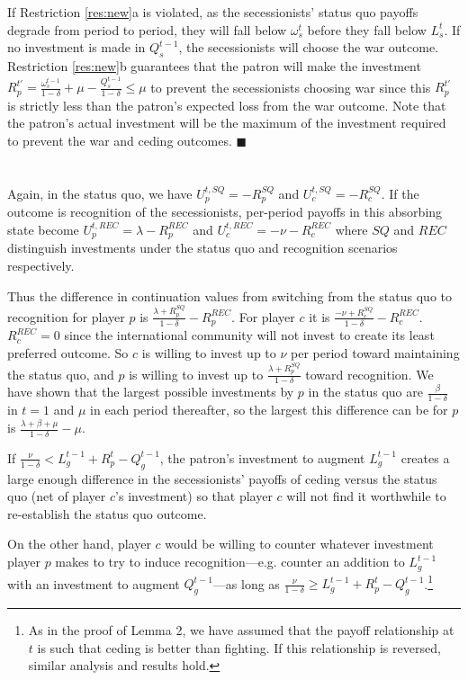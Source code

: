 \documentclass[11pt,letterpaper, notitlepage]{article}
\newcommand{\de}{\delta}
\begin{document}
If Restriction \ref{res:new}a is violated, as the secessionists' status quo payoffs degrade from period to period, they will fall below $\omega_s^t$ before they fall below $L_s^t$. If no investment is made in $Q_s^{t-1}$, the secessionists will choose the war outcome. Restriction \ref{res:new}b guarantees that the patron will make the investment $R_p^{t'}  = \frac{\omega_s^{t-1}}{1-\de} +\mu - \frac{Q_s^{t-1}}{1-\de} \leq \mu$ to prevent the secessionists choosing war since this $R_p^{t'}$ is strictly less than the patron's expected loss from the war outcome. Note that the patron's actual investment will be the maximum of the investment required to prevent the war and ceding outcomes. \hfill $\blacksquare$
\\
\\
 \\
Again, in the status quo, we have $U_p^{t,SQ}= -R_p^{SQ}$ and $U_c^{t,SQ}= -R_c^{SQ}$. If the outcome is recognition of the secessionists, per-period payoffs in this absorbing state become $U_p^{t,REC}= \lambda -R_p^{REC}$ and $U_c^{t,REC}= -\nu -R_c^{REC}$ where $SQ$ and $REC$ distinguish investments under the status quo and recognition scenarios respectively.

Thus the difference in continuation values from switching from the status quo to recognition for player $p$ is $\frac{\lambda +R_p^{SQ}}{1 -\de} -R_p^{REC}$. For player $c$ it is $\frac{-\nu + R_c^{SQ}}{1 -\de}-R_c^{REC}$. $R_c^{REC} =0$ since the international community will not invest to create its least preferred outcome. So $c$ is willing to invest up to $\nu$ per period toward maintaining the status quo, and $p$ is willing to invest up to $\frac{\lambda +R_p^{SQ}}{1 -\de}$ toward recognition. We have shown that the largest possible investments by $p$ in the status quo are $\frac{\beta}{1 -\de}$ in $t=1$ and $\mu$ in each period thereafter, so the largest this difference can be for $p$ is $\frac{\lambda + \beta + \mu}{1 -\de} -\mu$.

If $\frac{\nu}{1-\de} < L_g^{t-1} + R_p^t - Q_g^{t-1}$, the patron's investment to augment $L_g^{t-1}$ creates a large enough difference in the secessionists' payoffs of ceding versus the status quo (net of player $c$'s investment) so that player $c$ will not find it worthwhile to re-establish the status quo outcome.

On the other hand, player $c$ would be willing to counter whatever investment player $p$ makes to try to induce recognition---e.g. counter an addition to $L_g^{t-1}$ with an investment to augment $Q_g^{t-1}$---as long as $\frac{\nu}{1-\de} \geq L_g^{t-1} + R_p^t - Q_g^{t-1}$.\footnote{As in the proof of Lemma 2, we have assumed that the payoff relationship at $t$ is such that ceding is better than fighting. If this relationship is reversed, similar analysis and results hold.}
\end{document}
